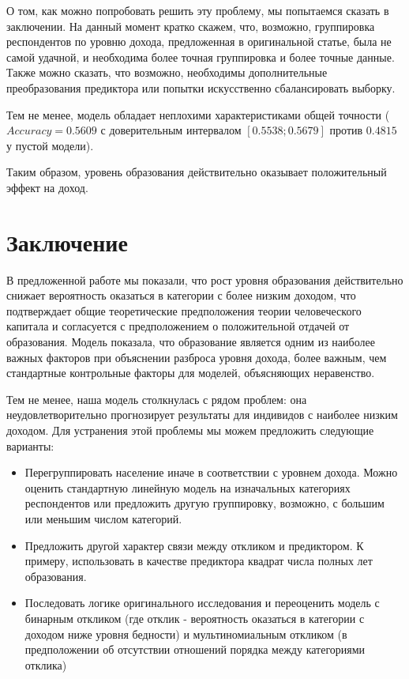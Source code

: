 \documentclass[a4paper]{article}
\begin{document}
О том, как можно попробовать решить эту проблему, мы попытаемся сказать в заключении. На данный момент кратко скажем, что, возможно, группировка респондентов по уровню дохода, предложенная в оригинальной статье, была не самой удачной, и необходима более точная группировка и более точные данные. Также можно сказать, что возможно, необходимы дополнительные преобразования предиктора или попытки искусственно сбалансировать выборку. 

Тем не менее, модель обладает неплохими характеристиками общей точности ($Accuracy = 0.5609$ с доверительным интервалом $[0.5538; 0.5679]$ против $0.4815$ у пустой модели). 

Таким образом, уровень образования действительно оказывает положительный эффект на доход. 
\newpage
\section*{Заключение}

В предложенной работе мы показали, что рост уровня образования действительно снижает вероятность оказаться в категории с более низким доходом, что подтверждает общие теоретические предположения теории человеческого капитала и согласуется с предположением о положительной отдачей от образования. Модель показала, что образование является одним из наиболее важных факторов при объяснении разброса уровня дохода, более важным, чем стандартные контрольные факторы для моделей, объясняющих неравенство. 

Тем не менее, наша модель столкнулась с рядом проблем: она неудовлетворительно прогнозирует результаты для индивидов с наиболее низким доходом. Для устранения этой проблемы мы можем предложить следующие варианты:

\begin{itemize}
	\item Перегруппировать население иначе в соответствии с уровнем дохода. Можно оценить стандартную линейную модель на изначальных категориях респондентов или предложить другую группировку, возможно, с большим или меньшим числом категорий. 
	\item Предложить другой характер связи между откликом и предиктором. К примеру, использовать в качестве предиктора квадрат числа полных лет образования. 
	\item Последовать логике оригинального исследования и переоценить модель с бинарным откликом (где отклик - вероятность оказаться в категории с доходом ниже уровня бедности) и мультиномиальным откликом (в предположении об отсутствии отношений порядка между категориями отклика)
\end{itemize}
\end{document}
